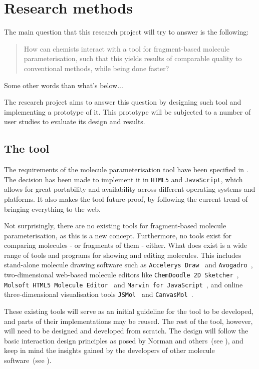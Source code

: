 \chapter{Research methods}

The main question that this research project will try to answer is the following:
\begin{quote}
How can chemists interact with a tool for fragment-based molecule parameterisation, such that this yields results of comparable quality to conventional methods, while being done faster?
\end{quote}
Some other words than what's below...

The research project aims to answer this question by designing such tool and implementing a prototype of it. This prototype will be subjected to a number of user studies to evaluate its design and results.


\section{The tool}

The requirements of the molecule parameterisation tool have been specified in . The decision has been made to implement it in \verb|HTML5| and \verb|JavaScript|, which allows for great portability and availability across different operating systems and platforms. It also makes the tool future-proof, by following the current trend of bringing everything to the web.

Not surprisingly, there are no existing tools for fragment-based molecule parameterisation, as this is a new concept. Furthermore, no tools exist for comparing molecules - or fragments of them - either. What does exist is a wide range of tools and programs for showing and editing molecules. This includes stand-alone molecule drawing software such as \verb|Accelerys Draw|~\cite{accelrys2012accelrys} and \verb|Avogadro|~\cite{hanwell2012avogadro}, two-dimensional web-based molecule editors like \verb|ChemDoodle 2D Sketcher|~\cite{ichemlabs2013chemdoodle}, \verb|Molsoft HTML5 Molecule Editor|~\cite{molsoft2012molsoft} and \verb|Marvin for JavaScript|~\cite{chemxon2013marvin}, and online three-dimensional visualisation tools \verb|JSMol|~\cite{hanson2013jsmol} and \verb|CanvasMol|~\cite{altered2013canvasmol}.

These existing tools will serve as an initial guideline for the tool to be developed, and parts of their implementations may be reused. The rest of the tool, however, will need to be designed and developed from scratch. The design will follow the basic interaction design principles as posed by Norman and others~(see ), and keep in mind the insights gained by the developers of other molecule software~(see ).

